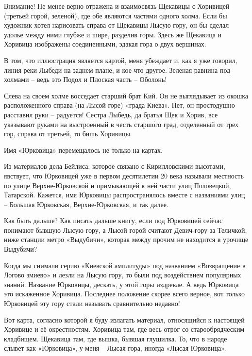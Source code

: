 Внимание! Не менее верно отражена и взаимосвязь Щекавицы с Хоривицей (третьей горой, зеленой), где обе являются частями одного холма. Если бы художник хотел нарисовать справа от Щекавицы Лысую гору, он бы сделал удолье между ними глубже и шире, разделив горы. Здесь же Щекавица и Хоривица изображены соединенными, эдакая гора о двух вершинах.

В том, что иллюстрация является картой, меня убеждает и, как я уже говорил, линия реки Лыбеди на заднем плане, и кое-что другое. Зеленая равнина под холмами – ведь это Подол и Плоская часть – Оболонь!

Слева на своем холме восседает старший брат Кий. Он не выглядывает из окошка расположенного справа (на Лысой горе) «града Киева». Нет, он простодушно расставил руки – радуется! Сестра Лыбедь, да братья Щек и Хорив, все указывают руками на выстроенный в честь старш\'ого град, отделенный от трех гор, справа от третьей, то бишь Хоривицы.

Имя «Юрковица» перемещалось не только на картах.

Из материалов дела Бейлиса, которое связано с Кирилловскими высотами, явствует, что Юрковицей уже в первом десятилетии 20 века называли местность по улице Верхне-Юрковской и примыкающей к ней части улиц Половецкой, Татарской. Кажется, имя Юрковицы распространялось вместе с названиями улиц – Большая Юрковская, Верхне-Юрковская, и так далее.

Как быть дальше? Как писать дальше книгу, если под Юрковицей сейчас понимают бывшую Лысую гору, а Лысой горой считают Девич-гору за Теличкой, ниже станции метро «Выдубичи», которая между прочим не находится в урочище Выдубичи?


Когда мы снимали серию «Киевской амплитуды» под названием «Возвращение в Логово змиево» и лезли на Лысую гору, то были под воздействием популярных знаний. Название Юрковицы, дескать, у этой горы издревле. А ведь  Юрковица это искаженное Хоривица. Последнее положение скорее всего верное, вот только Юрковицей эту гору стали называть сравнительно недавно!

Вот карта, согласно которой я буду излагать материал, относящийся к настоящей Хоривице и её окрестностям. Хоривица там, где весь отрог со старообрядческим кладбищем. Щекавица там, где вышка, бывшая глушилка. То, что в народе слывет как «Юрковица», у меня – Лысая гора, иногда «Лысая-Юрковица».


